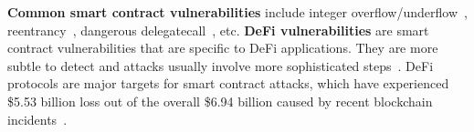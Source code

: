 

\noindent \textbf{Common smart contract vulnerabilities} include integer overflow/underflow~\cite{BECoverflow},
reentrancy~\cite{DAOattacks}, dangerous delegatecall~\cite{Paritystolen}, etc.
\textbf{DeFi vulnerabilities }are smart contract vulnerabilities that are specific to DeFi applications. They are
more subtle to detect and attacks usually involve more sophisticated steps~\cite{zhou2023sok}.
DeFi protocols are major targets for smart contract attacks, which have experienced \$5.53 billion loss
out of the overall \$6.94 billion caused by recent blockchain incidents~\cite{defillama}.








%

